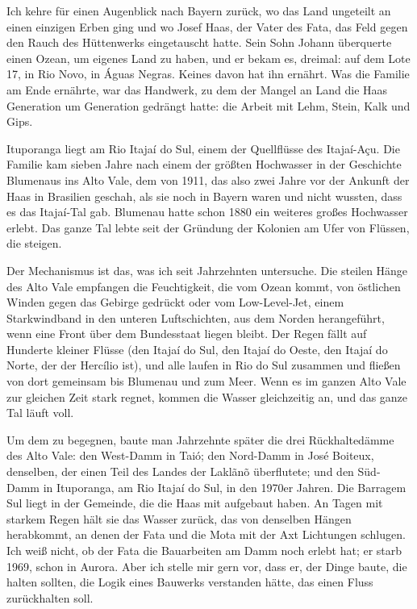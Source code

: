 \documentclass[
  ngerman,
  11pt,
  openany]{book}
\begin{document}
Ich kehre für einen Augenblick nach Bayern zurück, wo das Land ungeteilt
an einen einzigen Erben ging und wo Josef Haas, der Vater des Fata, das
Feld gegen den Rauch des Hüttenwerks eingetauscht hatte. Sein Sohn
Johann überquerte einen Ozean, um eigenes Land zu haben, und er bekam
es, dreimal: auf dem Lote 17, in Rio Novo, in Águas Negras. Keines davon
hat ihn ernährt. Was die Familie am Ende ernährte, war das Handwerk, zu
dem der Mangel an Land die Haas Generation um Generation gedrängt hatte:
die Arbeit mit Lehm, Stein, Kalk und Gips.

Ituporanga liegt am Rio Itajaí do Sul, einem der Quellflüsse des
Itajaí-Açu. Die Familie kam sieben Jahre nach einem der größten
Hochwasser in der Geschichte Blumenaus ins Alto Vale, dem von 1911, das
also zwei Jahre vor der Ankunft der Haas in Brasilien geschah, als sie
noch in Bayern waren und nicht wussten, dass es das Itajaí-Tal gab.
Blumenau hatte schon 1880 ein weiteres großes Hochwasser erlebt. Das
ganze Tal lebte seit der Gründung der Kolonien am Ufer von Flüssen, die
steigen.

Der Mechanismus ist das, was ich seit Jahrzehnten untersuche. Die
steilen Hänge des Alto Vale empfangen die Feuchtigkeit, die vom Ozean
kommt, von östlichen Winden gegen das Gebirge gedrückt oder vom
Low-Level-Jet, einem Starkwindband in den unteren Luftschichten, aus dem
Norden herangeführt, wenn eine Front über dem Bundesstaat liegen bleibt.
Der Regen fällt auf Hunderte kleiner Flüsse (den Itajaí do Sul, den
Itajaí do Oeste, den Itajaí do Norte, der der Hercílio ist), und alle
laufen in Rio do Sul zusammen und fließen von dort gemeinsam bis
Blumenau und zum Meer. Wenn es im ganzen Alto Vale zur gleichen Zeit
stark regnet, kommen die Wasser gleichzeitig an, und das ganze Tal läuft
voll.

Um dem zu begegnen, baute man Jahrzehnte später die drei Rückhaltedämme
des Alto Vale: den West-Damm in Taió; den Nord-Damm in José Boiteux,
denselben, der einen Teil des Landes der Laklãnõ überflutete; und den
Süd-Damm in Ituporanga, am Rio Itajaí do Sul, in den 1970er Jahren. Die
Barragem Sul liegt in der Gemeinde, die die Haas mit aufgebaut haben. An
Tagen mit starkem Regen hält sie das Wasser zurück, das von denselben
Hängen herabkommt, an denen der Fata und die Mota mit der Axt Lichtungen
schlugen. Ich weiß nicht, ob der Fata die Bauarbeiten am Damm noch
erlebt hat; er starb 1969, schon in Aurora. Aber ich stelle mir gern
vor, dass er, der Dinge baute, die halten sollten, die Logik eines
Bauwerks verstanden hätte, das einen Fluss zurückhalten soll.
\end{document}

